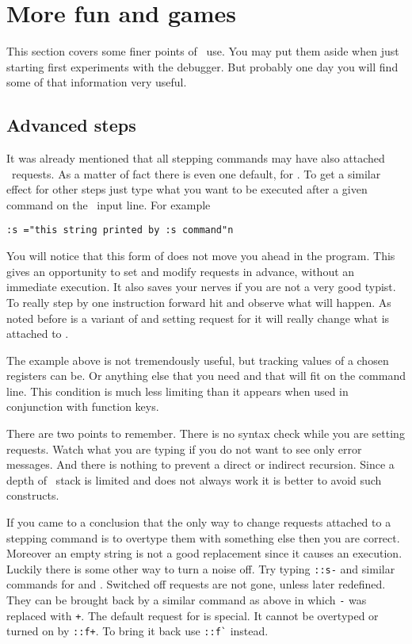 \section{More fun and games}

This section covers some finer points of \szadb\ use.
You may put them aside when just starting first experiments
with the debugger.
But probably one day you will find some of that information very
useful.

\subsection{Advanced steps}

It was already mentioned that all stepping commands may have also
attached \szadb\ requests.  As a matter of fact there is even one
default, for .  To get a similar effect for other steps
just type what you want to be executed after a given command on
the \szadb\ input line. For example
\begin{exmpl}
	{\tt :s ="this string printed by :s command"n}
\end{exmpl}
You will notice that this form of  does not
move you ahead in the program.
This gives an opportunity to set and modify requests in advance,
without an immediate execution.
It also saves your nerves if you are not a very good typist.
To really step by one instruction forward hit  and
observe what will happen.
As noted before  is a variant of  and setting
request for it will really change what is attached to .

The example above is not tremendously useful,
but tracking values of a chosen registers can be.
Or anything else that you need and that will fit on the command line.
This condition is much less limiting than it appears
when used in conjunction with function keys.

There are two points to remember.
There is no syntax check while you are setting requests.
Watch what you are typing if you do not want to see only error
messages.
And there is nothing to prevent a direct or indirect recursion.
Since a depth of \szadb\ stack is limited and  does
not always work it is better to avoid such constructs.

If you came to a conclusion that the only way to
change requests attached to a stepping command is to
overtype them with something else then you are correct.
Moreover an empty string is not a good replacement 
since it causes an execution.
Luckily there is some other way to turn a noise off.
Try typing \verb|::s-| and similar commands for  and
.  Switched off requests are not gone, unless later redefined.
They can be brought back by a similar command as above in which 
\verb|-| was replaced with \verb|+|.
The default request for  is special.
It cannot be overtyped or turned on by \verb|::f+|.
To bring it back use \verb|::f`| instead.

